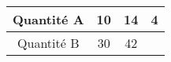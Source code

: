 \begin{tabular}{|c|c|c|c|}
\hline
Quantité A & 10 & 14 & 4 \\ \hline
Quantité B & 30 & 42 & \kern1cm \\ \hline
\end{tabular}

